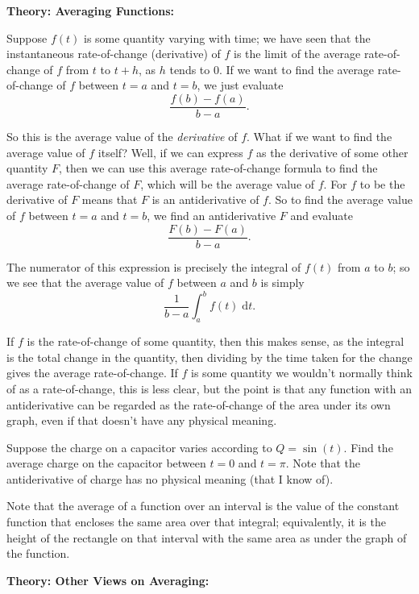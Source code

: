 \documentclass{article}
\newcommand{\diff}{\;\mathrm{d}}
\begin{document}
\textbf{Theory: Averaging Functions:}

\bigskip



Suppose $f(t)$ is some quantity varying with time; we have seen that the instantaneous rate-of-change (derivative) of $f$ is the limit of the average rate-of-change of $f$ from $t$ to $t+h$, as $h$ tends to 0. If we want to find the average rate-of-change of $f$ between $t=a$ and $t=b$, we just evaluate
\[\frac{f(b)-f(a)}{b-a}.\]

So this is the average value of the \textit{derivative} of $f$. What if we want to find the average value of $f$ itself? Well, if we can express $f$ as the derivative of some other quantity $F$, then we can use this average rate-of-change formula to find the average rate-of-change of $F$, which will be the average value of $f$. For $f$ to be the derivative of $F$ means that $F$ is an antiderivative of $f$. So to find the average value of $f$ between $t=a$ and $t=b$, we find an antiderivative $F$ and evaluate
\[\frac{F(b)-F(a)}{b-a}.\]

The numerator of this expression is precisely the integral of $f(t)$ from $a$ to $b$; so we see that the average value of $f$ between $a$ and $b$ is simply
\[\frac{1}{b-a}\int_a^b f(t)\diff t.\]

If $f$ is the rate-of-change of some quantity, then this makes sense, as the integral is the total change in the quantity, then dividing by the time taken for the change gives the average rate-of-change. If $f$ is some quantity we wouldn't normally think of as a rate-of-change, this is less clear, but the point is that any function with an antiderivative can be regarded as the rate-of-change of the area under its own graph, even if that doesn't have any physical meaning.\bigskip

Suppose the charge on a capacitor varies according to $Q=\sin(t)$. Find the average charge on the capacitor between $t=0$ and $t=\pi$. Note that the antiderivative of charge has no physical meaning (that I know of).

\vfill


Note that the average of a function over an interval is the value of the constant function that encloses the same area over that integral; equivalently, it is the height of the rectangle on that interval with the same area as under the graph of the function.


\clearpage




\textbf{Theory: Other Views on Averaging:}\bigskip
\end{document}
